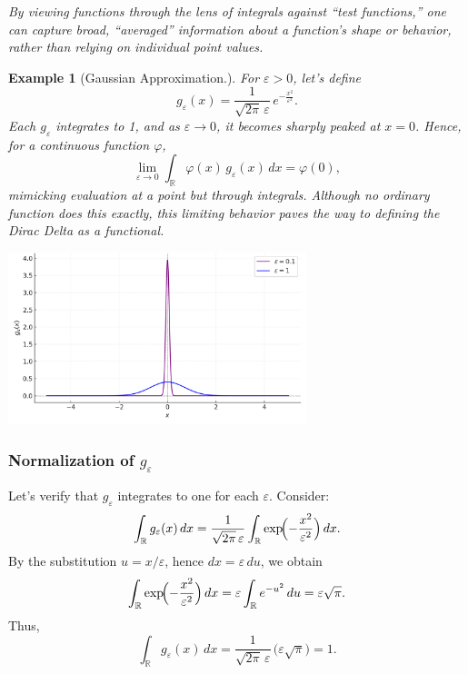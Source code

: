 \documentclass[11pt,openany]{book}
\newtheorem{example}{Example}[section]
\begin{document}
\textit{By viewing functions through the lens of integrals against “test functions,” one can capture broad, “averaged” information about a function’s shape or behavior, rather than relying on individual point values.}
\newpage
\begin{example}[Gaussian Approximation.]
    \noindent \newline For \(\varepsilon > 0\), let's define
        \[
        g_\varepsilon(x) = \frac{1}{\sqrt{2\pi}\,\varepsilon}\, e^{-\frac{x^2}{\varepsilon^2}}.
        \]
        Each \(g_\varepsilon\) integrates to 1, and as \(\varepsilon \to 0\), it becomes sharply peaked at \(x = 0\). Hence, for a continuous function \(\varphi\),
        \[
        \lim_{\varepsilon \to 0}\int_{\mathbb{R}} \varphi(x)\,g_\varepsilon(x)\,dx = \varphi(0),
        \]
        mimicking evaluation at a point but through integrals. Although no ordinary function does this exactly, this limiting behavior paves the way to defining the Dirac Delta as a \emph{functional}.
    \end{example}
\begin{center}
    \includegraphics[width=0.65\textwidth]{images/gaussian_bump_plot.png}
\end{center}
\subsubsection{Normalization of \(g_\varepsilon\)}
Let's verify that \(g_\varepsilon\) integrates to one for each \(\varepsilon\). Consider:
\[
\int_{\mathbb{R}} g_\varepsilon(x)\, dx
= \frac{1}{\sqrt{2\pi}\,\varepsilon}
  \int_{\mathbb{R}} \exp\!\Bigl(-\frac{x^2}{\varepsilon^2}\Bigr)\, dx.
\]
By the substitution \(u = x / \varepsilon\), hence \(dx = \varepsilon\,du\), we obtain
\[
\int_{\mathbb{R}} \exp\!\Bigl(-\frac{x^2}{\varepsilon^2}\Bigr)\, dx
= \varepsilon \int_{\mathbb{R}} e^{-u^2}\, du
= \varepsilon \sqrt{\pi}.
\]
Thus,
\[
\int_{\mathbb{R}} g_\varepsilon(x)\, dx
= \frac{1}{\sqrt{2\pi}\,\varepsilon}\,\bigl(\varepsilon\sqrt{\pi}\bigr)
= 1.
\]
\end{document}
